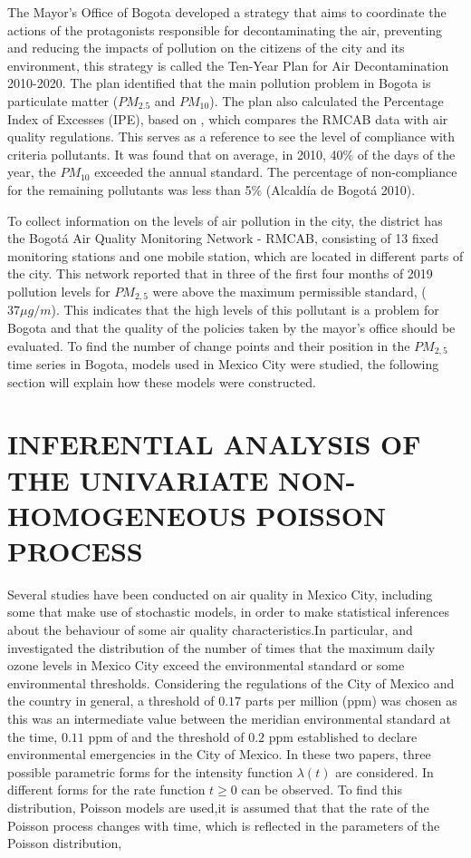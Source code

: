 \documentclass[APA,STIX1COL]{WileyNJD-v2}
\begin{document}
The Mayor's Office of Bogota developed a strategy that aims to coordinate the actions of the protagonists responsible for decontaminating the air, preventing and reducing the impacts of pollution on the citizens of the city and its environment, this strategy is called the Ten-Year Plan for Air Decontamination 2010-2020. The plan identified that the main pollution problem in Bogota is particulate matter ($PM_{2.5}$ and $PM_{10}$).  The plan also calculated the Percentage Index of Excesses (IPE), based on \cite{Gaitan}, which compares the RMCAB data with air quality regulations.  This serves as a reference to see the level of compliance with criteria pollutants. It was found that on average, in 2010, 40\% of the days of the year, the $PM_{10}$ exceeded the annual standard. The percentage of non-compliance for the remaining pollutants was less than 5\% (Alcaldía de Bogotá 2010).

To collect information on the levels of air pollution in the city, the district has the Bogotá Air Quality Monitoring Network - RMCAB, consisting of 13 fixed monitoring stations and one mobile station, which are located in different parts of the city.
This network reported that in three of the first four months of 2019 pollution levels for $PM_{2,5}$ were above the maximum permissible standard, ($37 \mu g / m$). This indicates that the high levels of this pollutant is a problem for Bogota and that the quality of the policies taken by the mayor's office should be evaluated.
To find the number of change points and their position in the $PM_{2,5}$ time series in Bogota, models used in Mexico City were studied, the following section will explain how these models were constructed.


\section{INFERENTIAL ANALYSIS OF THE UNIVARIATE NON-HOMOGENEOUS POISSON
PROCESS}\label{sec4}



Several studies have been conducted on air quality in Mexico City, including some that make use of stochastic models, in order to make statistical inferences about the behaviour of some air quality characteristics.In particular, \cite{Achcar09} and \cite{Achcar10} investigated the distribution of the number of times that the maximum daily ozone levels in Mexico City exceed the environmental standard or some environmental thresholds. Considering the regulations of the City of Mexico and the country in general, a threshold of $0.17$ parts per million (ppm) was chosen as this was an intermediate value between the meridian environmental standard at the time, $0.11$ ppm of and the threshold of $0.2$ ppm established to declare environmental emergencies in the City of Mexico. In these two papers, three possible parametric forms for the intensity function $\lambda(t)$ are considered. In \cite{Rodrigues13} different forms for the rate function $t\geq 0$ can be observed.
To find this distribution, Poisson models are used,it is assumed that that the rate of the Poisson process changes with time, which is reflected in the parameters of the Poisson distribution, 
\end{document}
